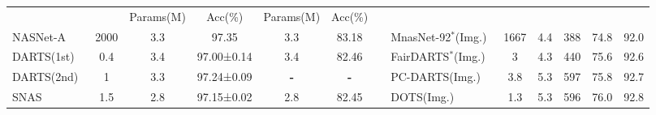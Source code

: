 \documentclass[10pt,twocolumn,letterpaper]{article}
\begin{document}
\begin{table*}[t]
\begin{center}
{\begin{tabular}{lcccccllccccc}
                        &                                                                       & Params(M)    & Acc(\%)       & Params(M)     & Acc(\%)       &  &                                     &                                                                       &                                                                       &                                                                      &                                                                      &                                                                      \\ \cline{1-6} \cline{8-13} 
NASNet-A~\cite{nasnet}                & 2000                                                                  & 3.3          & 97.35         & 3.3           & 83.18         &  & MnasNet-92$^\ast$(Img.)~\cite{mnasnet}                    & 1667                                                                  & 4.4                                                                   & 388                                                                  & 74.8                                                                 & 92.0                                                                 \\
DARTS(1st)~\cite{darts}              & 0.4                                                                   & 3.4          & 97.00±0.14    & 3.4           & 82.46         &  & FairDARTS$^\ast$(Img.)~\cite{fairdarts}                     & 3                                                                     & 4.3                                                                   & 440                                                                  & 75.6                                                                 & 92.6                                                                 \\
DARTS(2nd)~\cite{darts}              & 1                                                                     & 3.3          & 97.24±0.09    & \textbf{-}    & \textbf{-}    &  & PC-DARTS(Img.)~\cite{pc-darts}                      & 3.8                                                                   & 5.3                                                                   & 597                                                                  & 75.8                                                                 & 92.7                                                                 \\
SNAS~\cite{snas}                    & 1.5                                                                   & 2.8          & 97.15±0.02    & 2.8           & 82.45         &  & DOTS(Img.)~\cite{dots}                          & 1.3                                                                   & 5.3                                                                   & 596                                                                  & 76.0                                                                 & 92.8                                                                 \\

\end{tabular}}
\end{center}
\end{table*}
\end{document}
